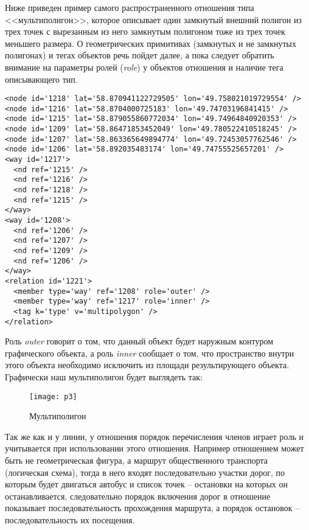 Ниже приведен пример самого распространенного отношения типа <<мультиполигон>>, 
которое описывает один замкнутый внешний полигон из трех точек с вырезанным из 
него замкнутым полигоном тоже из трех точек меньшего размера. О геометрических 
примитивах (замкнутых и не замкнутых полигонах) и тегах объектов речь пойдет 
далее, а пока следует обратить внимание на параметры ролей (\emph{role}) у 
объектов отношения и наличие тега описывающего тип. 

\small
\begin{verbatim}
<node id='1218' lat='58.870941122729505' lon='49.758021019729554' />
<node id='1216' lat='58.8704000725183' lon='49.74703196841415' />
<node id='1215' lat='58.879055860772034' lon='49.74964840920353' />
<node id='1209' lat='58.86471853452049' lon='49.780522410518245' />
<node id='1207' lat='58.863365649894774' lon='49.72453057762546' />
<node id='1206' lat='58.892035483174' lon='49.74755525657201' />
<way id='1217'>
  <nd ref='1215' />
  <nd ref='1216' />
  <nd ref='1218' />
  <nd ref='1215' />
</way>
<way id='1208'>
  <nd ref='1206' />
  <nd ref='1207' />
  <nd ref='1209' />
  <nd ref='1206' />
</way>
<relation id='1221'>
  <member type='way' ref='1208' role='outer' />
  <member type='way' ref='1217' role='inner' />
  <tag k='type' v='multipolygon' />
</relation>
\end{verbatim}
\normalsize

Роль \emph{outer} говорит о том, что данный объект будет наружным контуром 
графического объекта, а роль \emph{inner} сообщает о том, что пространство 
внутри этого объекта необходимо исключить из площади результирующего объекта. 
Графически наш мультиполигон будет выглядеть так:

\begin{figure}[ht!]
    \center
    \texttt{[image: p3]}
    \caption{Мультиполигон}
    \label{multipoly01}
\end{figure}

Так же как и у линии, у отношения порядок перечисления членов играет роль и 
учитывается при использовании этого отношения. Например отношением может быть 
не геометрическая фигура, а маршрут общественного транспорта (логическая 
схема), тогда в него входят последовательно участки дорог, по которым будет 
двигаться автобус и список точек -- остановки на которых он останавливается, 
следовательно порядок включения дорог в отношение показывает последовательность 
прохождения маршрута, а порядок остановок -- последовательность их посещения.

